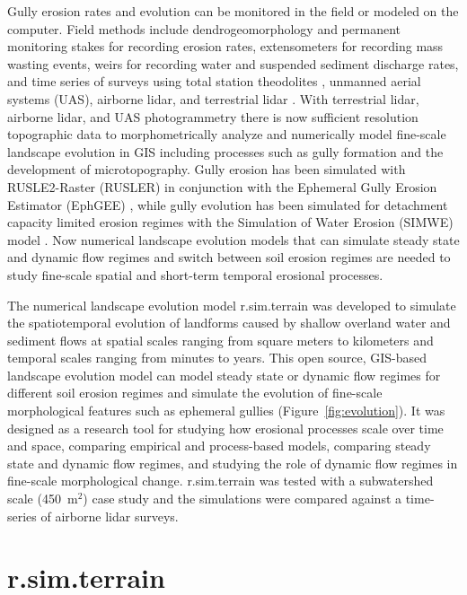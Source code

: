 \documentclass[gmd, manuscript]{copernicus}
\begin{document}
Gully erosion rates and evolution
can be monitored in the field 
or modeled on the computer. 
Field methods include
dendrogeomorphology \citep{Malik2008} and 
permanent monitoring stakes for recording erosion rates, 
extensometers for recording mass wasting events, 
weirs for recording water and suspended sediment discharge rates, 
and time series of surveys using 
total station theodolites \citep{Thomas2004},
unmanned aerial systems (UAS),
airborne lidar, and terrestrial lidar \citep{Starek2011,Bechet2016}.
With terrestrial lidar, airborne lidar, and 
UAS photogrammetry
there is now sufficient resolution topographic data 
to morphometrically analyze and 
numerically model fine-scale landscape evolution in GIS
including processes such as gully formation 
and the development of microtopography. 
Gully erosion has been simulated with 
RUSLE2-Raster (RUSLER)
in conjunction with the Ephemeral Gully Erosion Estimator (EphGEE)
\citep{Dabney2014},
while gully evolution
has been simulated for detachment capacity limited erosion regimes
with the Simulation of Water Erosion (SIMWE) model
\citep{Koco2011, Mitasova2013}. 
Now numerical landscape evolution models 
that can simulate 
steady state and dynamic flow regimes
and switch between soil erosion regimes 
are needed to study 
fine-scale spatial and short-term temporal erosional processes.

The numerical landscape evolution model 
r.sim.terrain was developed to 
simulate the spatiotemporal evolution of landforms
caused by shallow overland water and sediment flows
at spatial scales ranging from
square meters to kilometers
and temporal scales ranging from minutes to years. 
This open source, GIS-based landscape evolution model can
model steady state or dynamic flow regimes
for different soil erosion regimes and
simulate the evolution of fine-scale morphological features 
such as ephemeral gullies
(Figure~\ref{fig:evolution}).
It was designed as a research tool for
studying how erosional processes scale over time and space,
comparing empirical and process-based models, 
comparing steady state and dynamic flow regimes, and
studying the role of dynamic flow regimes 
in fine-scale morphological change. 
r.sim.terrain was tested with 
a subwatershed scale (450~\unit{m}$^{2}$) case study
and the simulations were compared against 
a time-series of airborne lidar surveys.

\section{r.sim.terrain}
\end{document}
